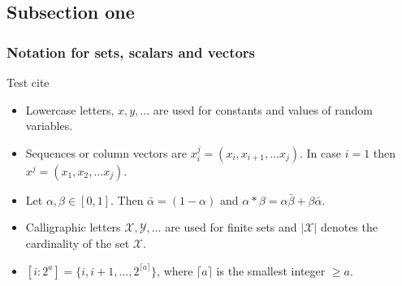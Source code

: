 \documentclass[]{beamer}
\begin{document}
\subsection{Subsection one}
\begin{frame}
\frametitle{Notation for sets, scalars and vectors}
Test cite \cite{telatar99}
\begin{itemize}[<+->] %
\item Lowercase letters, $x,y,...$ are used for constants and values of random variables. \item Sequences or column vectors are $x_i^j=(x_i, x_{i+1}, ...x_j)$. In case $i=1$ then $x^j=(x_1, x_2, ...x_j)$.
\item Let $\alpha, \beta \in [0,1]$. Then $\bar{\alpha}=(1-\alpha)$ and $\alpha * \beta = \alpha \bar{\beta}+\beta \bar{\alpha}$.
\item Calligraphic letters $\mathcal{X,Y, ...}$ are used for finite sets and $|\mathcal{X}|$ denotes the cardinality of the set $\mathcal{X}$.
\item $[i:2^a]=\{i, i+1, ..., 2^{\lceil{a}\rceil}\}$, where $\lceil{a}\rceil$ is the smallest integer $\geq a$.
\end{itemize}
\end{frame}


\end{document}
